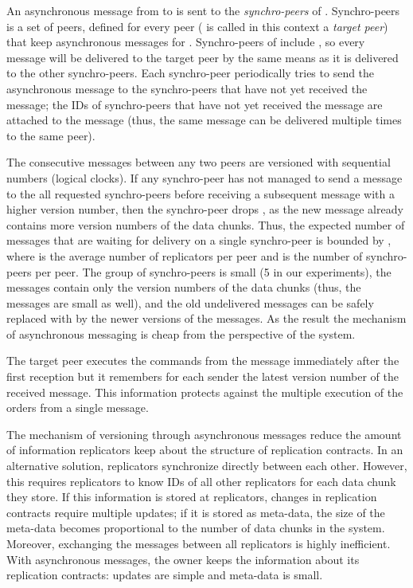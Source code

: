 \documentclass[10pt, final, conference, letterpaper]{IEEEtran}
\begin{document}
An asynchronous message from  to  is sent to the \emph{synchro-peers} of . 
Synchro-peers is a set of peers, defined for every peer  ( is called in this context a \emph{target peer})
that keep asynchronous messages for . Synchro-peers of  include , so every message will be delivered to the target peer by the same means as it is delivered to the other synchro-peers.
Each synchro-peer periodically tries to send the asynchronous message to the synchro-peers that have not yet received the message; the IDs of synchro-peers that have not yet received the message are attached to the message (thus, the same message can be delivered multiple times to the same peer).

The consecutive messages between any two peers are versioned with sequential numbers (logical clocks). If any synchro-peer  has not managed to send a message  to the all requested synchro-peers before receiving a subsequent message  with a higher version number, then the synchro-peer drops , as the new message already contains more version numbers of the data chunks. Thus, the expected number of messages that are waiting for delivery on a single synchro-peer is bounded by , where  is the average number of replicators per peer and  is the number of synchro-peers per peer. The group of synchro-peers is small (5 in our experiments), the messages contain only the version numbers of the data chunks (thus, the messages are small as well), and the old undelivered messages can be safely replaced with by the newer versions of the messages. As the result the mechanism of asynchronous messaging is cheap from the perspective of the system.

The target peer executes the commands from the message immediately after the first reception but it remembers for each sender the latest version number of the received message. This information protects against the multiple execution of the orders from a single message.

The mechanism of versioning through asynchronous messages reduce the amount of information replicators keep about the structure of replication contracts. In an alternative solution, replicators synchronize directly between each other. However, this requires replicators to know IDs of all other replicators for each data chunk they store. If this information is stored at replicators, changes in replication contracts require multiple updates; if it is stored as meta-data, the size of the meta-data becomes proportional to the number of data chunks in the system. Moreover, exchanging the messages between all replicators is highly inefficient. With asynchronous messages, the owner keeps the information about its replication contracts: updates are simple and meta-data is small.
\end{document}
